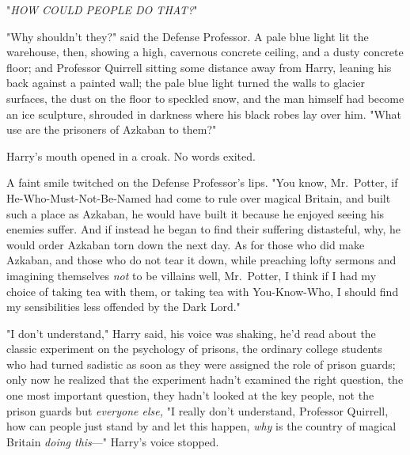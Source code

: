 "\emph{HOW COULD PEOPLE DO THAT?}"

"Why shouldn't they?" said the Defense Professor. A pale blue light lit the
warehouse, then, showing a high, cavernous concrete ceiling, and a dusty
concrete floor; and Professor Quirrell sitting some distance away from Harry,
leaning his back against a painted wall; the pale blue light turned the walls
to glacier surfaces, the dust on the floor to speckled snow, and the man
himself had become an ice sculpture, shrouded in darkness where his black robes
lay over him. "What use are the prisoners of Azkaban to them?"

Harry's mouth opened in a croak. No words exited.

A faint smile twitched on the Defense Professor's lips. "You know, Mr.~Potter,
if He-Who-Must-Not-Be-Named had come to rule over magical Britain, and built
such a place as Azkaban, he would have built it because he enjoyed seeing his
enemies suffer. And if instead he began to find their suffering distasteful,
why, he would order Azkaban torn down the next day. As for those who did make
Azkaban, and those who do not tear it down, while preaching lofty sermons and
imagining themselves \emph{not} to be villains{\el} well, Mr.~Potter, I
think if I had my choice of taking tea with them, or taking tea with
You-Know-Who, I should find my sensibilities less offended by the Dark Lord."

"I don't understand," Harry said, his voice was shaking, he'd read about the
classic experiment on the psychology of prisons, the ordinary college students
who had turned sadistic as soon as they were assigned the role of prison
guards; only now he realized that the experiment hadn't examined the right
question, the one most important question, they hadn't looked at the key
people, not the prison guards but \emph{everyone else,} "I really don't
understand, Professor Quirrell, how can people just stand by and let this
happen, \emph{why} is the country of magical Britain \emph{doing this}\mbox{---}"
Harry's voice stopped.


